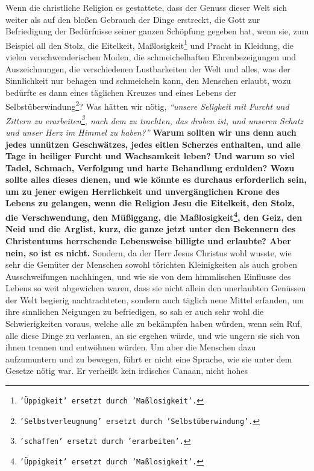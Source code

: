Wenn die christliche Religion es gestattete, dass der Genuss dieser Welt sich
weiter als auf den bloßen Gebrauch der Dinge erstreckt, die Gott zur
Befriedigung der Bedürfnisse seiner ganzen Schöpfung gegeben hat, wenn sie, zum Beispiel
all den Stolz, die Eitelkeit, Maßlosigkeit\footnote{\texttt{'Üppigkeit' ersetzt
durch 'Maßlosigkeit'.}}
und Pracht in Kleidung, die vielen
verschwenderischen Moden, die schmeichelhaften Ehrenbezeigungen und
Auszeichnungen, die verschiedenen Lustbarkeiten der Welt und alles, was der
Sinnlichkeit nur behagen und schmeicheln kann, den Menschen erlaubt, wozu
bedürfte es dann eines täglichen Kreuzes und eines Lebens
der Selbstüberwindung\footnote{\texttt{'Selbstverleugnung' ersetzt durch
'Selbstüberwindung'.}}?
Was hätten wir nötig,
\textit{"`unsere Seligkeit mit Furcht und Zittern zu
erarbeiten\footnote{\texttt{'schaffen' ersetzt durch 'erarbeiten'.}},
nach dem zu trachten, das droben ist, und unseren Schatz und unser Herz im
Himmel
zu haben?"'} \label{ref:16_01_warum}
\textbf{Warum sollten wir uns denn auch jedes unnützen Geschwätzes, jedes
eitlen Scherzes enthalten, und alle Tage in heiliger Furcht und Wachsamkeit
leben? Und warum so viel Tadel, Schmach, Verfolgung und harte Behandlung
erdulden? Wozu sollte alles dieses dienen, und wie könnte es durchaus
erforderlich sein, um zu jener ewigen Herrlichkeit und unvergänglichen Krone
des Lebens zu gelangen, wenn die Religion Jesu die
Eitelkeit, den Stolz, die
Verschwendung, den Müßiggang, die Maßlosigkeit\footnote{\texttt{'Üppigkeit'
ersetzt durch 'Maßlosigkeit'.}},
den Geiz, den Neid und die
Arglist, kurz, die ganze jetzt unter den Bekennern des Christentums
herrschende Lebensweise billigte und erlaubte? Aber nein, so ist es nicht.}
Sondern, da der Herr Jesus Christus wohl wusste, wie sehr die Gemüter der
Menschen sowohl törichten Kleinigkeiten als auch groben Ausschweifungen
nachhingen, und wie sie von dem himmlischen Einflusse des Lebens so weit
abgewichen waren, dass sie nicht allein den unerlaubten Genüssen der Welt
begierig nachtrachteten, sondern auch täglich neue Mittel erfanden, um ihre
sinnlichen Neigungen zu befriedigen, so sah er auch sehr wohl die
Schwierigkeiten voraus, welche alle zu bekämpfen haben würden, wenn sein Ruf,
alle diese Dinge zu verlassen, an sie ergehen würde, und wie ungern sie sich von
ihnen trennen und entwöhnen würden. Um aber die Menschen dazu aufzumuntern und
zu bewegen, führt er nicht eine Sprache, wie sie unter dem Gesetze nötig war. Er
verheißt kein irdisches Canaan, nicht hohes
